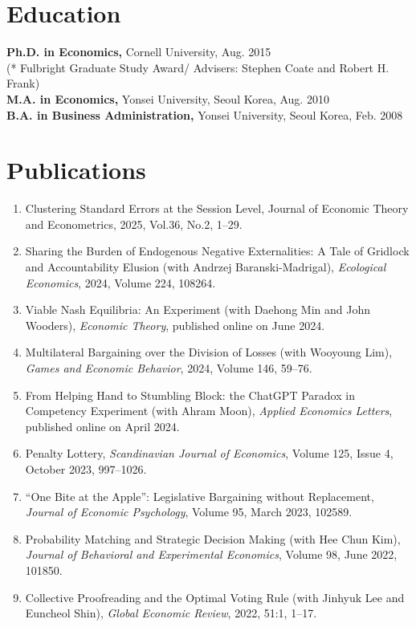 \documentclass[margin, a4paper]{res}
\begin{document}
\begin{resume}
\section{Education} 
\textbf{Ph.D. in Economics,} Cornell University, Aug. 2015\\
(* Fulbright Graduate Study Award/ Advisers: Stephen Coate and Robert H. Frank)\\
\textbf{M.A. in Economics,} Yonsei University, Seoul Korea,  Aug. 2010\\
\textbf{B.A. in Business Administration,} Yonsei University, Seoul Korea, Feb. 2008

\section{Publications}
\begin{enumerate}[leftmargin=*]
\item Clustering Standard Errors at the Session Level, Journal of Economic Theory and Econometrics, 2025, Vol.36, No.2, 1--29.
\item Sharing the Burden of Endogenous Negative Externalities: A Tale of Gridlock and Accountability Elusion (with Andrzej Baranski-Madrigal), \emph{Ecological Economics}, 2024, Volume 224, 108264.
\item Viable Nash Equilibria: An Experiment (with Daehong Min and John Wooders), \emph{Economic Theory}, published online on June 2024.
\item Multilateral Bargaining over the Division of Losses (with Wooyoung Lim), \emph{Games and Economic Behavior}, 2024, Volume 146, 59--76.
\item From Helping Hand to Stumbling Block: the ChatGPT Paradox in Competency Experiment (with Ahram Moon), \emph{Applied Economics Letters}, published online on April 2024.
\item Penalty Lottery, \emph{Scandinavian Journal of Economics}, Volume 125, Issue 4, October 2023, 997--1026.
\item ``One Bite at the Apple'': Legislative Bargaining without Replacement, \emph{Journal of Economic Psychology}, Volume 95, March 2023, 102589.
\item Probability Matching and Strategic Decision Making (with Hee Chun Kim), \emph{Journal of Behavioral and Experimental Economics}, Volume 98, June 2022, 101850.
\item Collective Proofreading and the Optimal Voting Rule (with Jinhyuk Lee and Euncheol Shin), \emph{Global Economic Review}, 2022, 51:1, 1--17.

\end{enumerate}
\end{resume}
\end{document}
